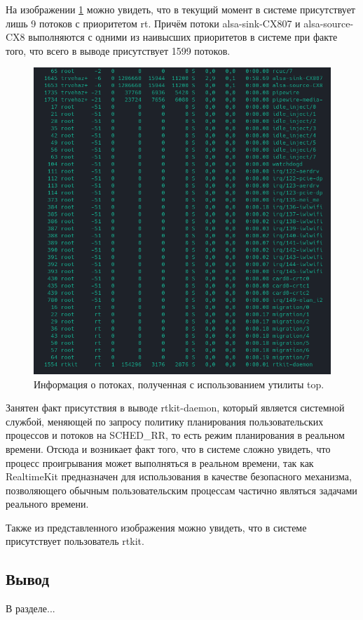 На изображении \ref{fig:rtThreads} можно увидеть, что в текущий момент в системе присутствует лишь 9 потоков с приоритетом rt. Причём потоки alsa-sink-CX807 и alsa-source-CX8 выполняются с одними из наивысших приоритетов в системе при факте того, что всего в выводе присутствует 1599 потоков.

\begin{figure}[H]
	\centering
	\includegraphics[scale=0.7]{img/rtThreads.png}
	\caption{Информация о потоках, полученная с использованием утилиты top. }
	\label{fig:rtThreads}
\end{figure}

Занятен факт присутствия в выводе rtkit-daemon, который является системной службой, меняющей по запросу политику планирования пользовательских процессов и потоков на SCHED\_RR, то есть режим планирования в реальном времени. Отсюда и возникает факт того, что в системе сложно увидеть, что процесс проигрывания может выполняться в реальном времени, так как RealtimeKit предназначен для использования в качестве безопасного механизма, позволяющего обычным пользовательским процессам частично являться задачами реального времени.

Также из представленного изображения можно увидеть, что в системе присутствует пользователь rtkit.

\subsection*{Вывод}
В разделе...
